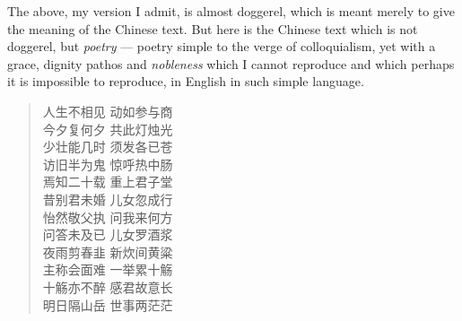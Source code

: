 The above, my version I admit, is almost doggerel, which is meant merely to give the meaning of the Chinese text.
But here is the Chinese text which is not doggerel, but \emph{poetry} --- poetry simple to the verge of colloquialism, yet with a grace, dignity pathos and \emph{nobleness} which I cannot reproduce and which perhaps it is impossible to reproduce, in English in such simple language.
\begin{quote}\footnotesize
    人生不相见 \qquad 动如参与商  \\
    今夕复何夕 \qquad 共此灯烛光 \\
    少壮能几时 \qquad 须发各已苍 \\
    访旧半为鬼 \qquad 惊呼热中肠 \\
    焉知二十载 \qquad 重上君子堂 \\
    昔别君未婚 \qquad 儿女忽成行 \\
    怡然敬父执 \qquad 问我来何方 \\
    问答未及已 \qquad 儿女罗酒浆 \\
    夜雨剪春韭 \qquad 新炊间黄粱 \\
    主称会面难 \qquad 一举累十觞 \\
    十觞亦不醉 \qquad 感君故意长 \\
    明日隔山岳 \qquad 世事两茫茫 \\
\end{quote}

